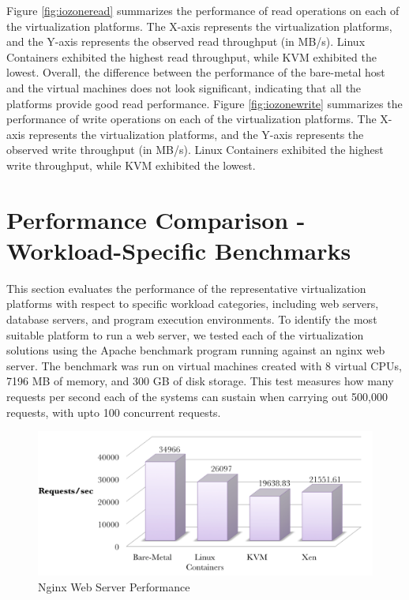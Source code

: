Figure \ref{fig:iozoneread} summarizes the performance of read operations on each of the virtualization platforms. The X-axis represents the virtualization platforms, and the Y-axis represents the observed read throughput (in MB/s). Linux Containers exhibited the highest read throughput, while KVM exhibited the lowest. Overall, the difference between the performance of the bare-metal host and the virtual machines does not look significant, indicating that all the platforms provide good read performance. Figure \ref{fig:iozonewrite} summarizes the performance of write operations on each of the virtualization platforms. The X-axis represents the virtualization platforms, and the Y-axis represents the observed write throughput (in MB/s). Linux Containers exhibited the highest write throughput, while KVM exhibited the lowest. 


\section{Performance Comparison - Workload-Specific Benchmarks}

This section evaluates the performance of the representative virtualization platforms with respect to specific workload categories, including web servers, database servers, and program execution environments. To identify the most suitable platform to run a web server, we tested each of the virtualization solutions using the Apache benchmark program running against an nginx web server. The benchmark was run on virtual machines created with 8 virtual CPUs, 7196 MB of memory, and 300 GB of disk storage. This test measures how many requests per second each of the systems can sustain when carrying out 500,000 requests, with upto 100 concurrent requests.

\begin{figure}[H]
\centering
\includegraphics[width=150mm]{nginx.png}
\caption{Nginx Web Server Performance}
\label{fig:nginx}
\end{figure}


